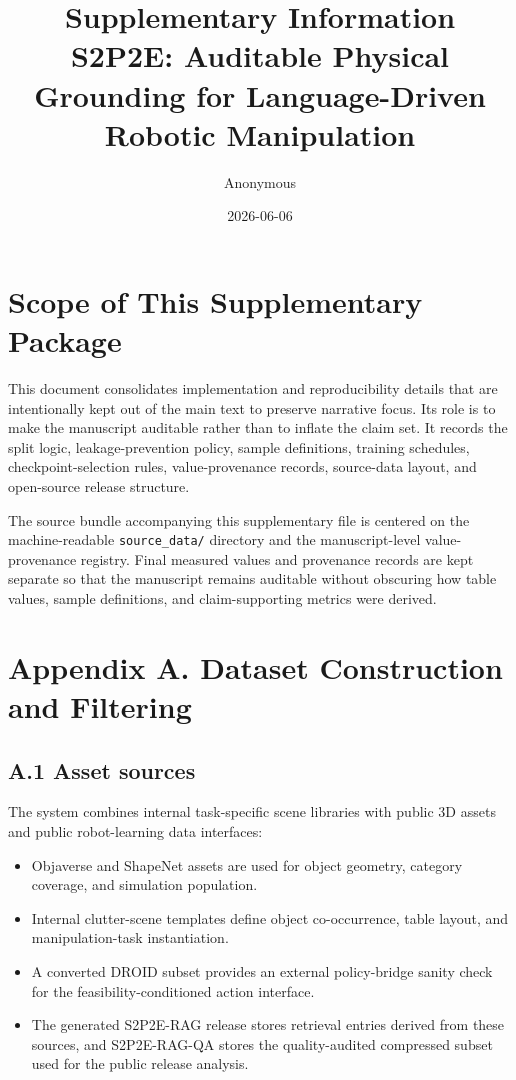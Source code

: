 \documentclass[11pt]{article}
\title{Supplementary Information\\S2P2E: Auditable Physical Grounding for Language-Driven Robotic Manipulation}
\author{Anonymous}
\date{2026-06-06}
\begin{document}
\maketitle

\section{Scope of This Supplementary Package}

This document consolidates implementation and reproducibility details that are intentionally kept out of the main text to preserve narrative focus. Its role is to make the manuscript auditable rather than to inflate the claim set. It records the split logic, leakage-prevention policy, sample definitions, training schedules, checkpoint-selection rules, value-provenance records, source-data layout, and open-source release structure.

The source bundle accompanying this supplementary file is centered on the machine-readable \texttt{source\_data/} directory and the manuscript-level value-provenance registry. Final measured values and provenance records are kept separate so that the manuscript remains auditable without obscuring how table values, sample definitions, and claim-supporting metrics were derived.

\section{Appendix A. Dataset Construction and Filtering}

\subsection{A.1 Asset sources}

The system combines internal task-specific scene libraries with public 3D assets and public robot-learning data interfaces:

\begin{itemize}[leftmargin=1.5em]
\item Objaverse and ShapeNet assets are used for object geometry, category coverage, and simulation population.
\item Internal clutter-scene templates define object co-occurrence, table layout, and manipulation-task instantiation.
\item A converted DROID subset provides an external policy-bridge sanity check for the feasibility-conditioned action interface.
\item The generated S2P2E-RAG release stores retrieval entries derived from these sources, and S2P2E-RAG-QA stores the quality-audited compressed subset used for the public release analysis.
\end{itemize}
\end{document}
